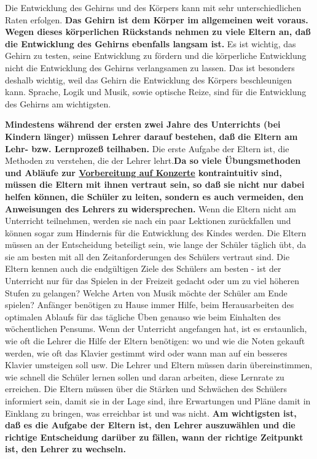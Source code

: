 Die Entwicklung des Gehirns und des Körpers kann mit sehr unterschiedlichen Raten erfolgen.
\textbf{Das Gehirn ist dem Körper im allgemeinen weit voraus.
Wegen dieses körperlichen Rückstands nehmen zu viele Eltern an, daß die Entwicklung des Gehirns ebenfalls langsam ist.}
Es ist wichtig, das Gehirn zu testen, seine Entwicklung zu fördern und die körperliche Entwicklung nicht die Entwicklung des Gehirns verlangsamen zu lassen.
Das ist besonders deshalb wichtig, weil das Gehirn die Entwicklung des Körpers beschleunigen kann.
Sprache, Logik und Musik, sowie optische Reize, sind für die Entwicklung des Gehirns am wichtigsten.

\textbf{Mindestens während der ersten zwei Jahre des Unterrichts (bei Kindern länger) müssen Lehrer darauf bestehen, daß die Eltern am Lehr- bzw. Lernprozeß teilhaben.}
Die erste Aufgabe der Eltern ist, die Methoden zu verstehen, die der Lehrer lehrt.\textbf{Da so viele Übungsmethoden und Abläufe zur \hyperlink{c1iii14}{Vorbereitung auf Konzerte} kontraintuitiv sind, müssen die Eltern mit ihnen vertraut sein, so daß sie nicht nur dabei helfen können, die Schüler zu leiten, sondern es auch vermeiden, den Anweisungen des Lehrers zu widersprechen.}
Wenn die Eltern nicht am Unterricht teilnehmen, werden sie nach ein paar Lektionen zurückfallen und können sogar zum Hindernis für die Entwicklung des Kindes werden.
Die Eltern müssen an der Entscheidung beteiligt sein, wie lange der Schüler täglich übt, da sie am besten mit all den Zeitanforderungen des Schülers vertraut sind.
Die Eltern kennen auch die endgültigen Ziele des Schülers am besten - ist der Unterricht nur für das Spielen in der Freizeit gedacht oder um zu viel höheren Stufen zu gelangen?
Welche Arten von Musik möchte der Schüler am Ende spielen?
Anfänger benötigen zu Hause immer Hilfe, beim Herausarbeiten des optimalen Ablaufs für das tägliche Üben genauso wie beim Einhalten des wöchentlichen Pensums.
Wenn der Unterricht angefangen hat, ist es erstaunlich, wie oft die Lehrer die Hilfe der Eltern benötigen: wo und wie die Noten gekauft werden, wie oft das Klavier gestimmt wird oder wann man auf ein besseres Klavier umsteigen soll usw.
Die Lehrer und Eltern müssen darin übereinstimmen, wie schnell die Schüler lernen sollen und daran arbeiten, diese Lernrate zu erreichen.
Die Eltern müssen über die Stärken und Schwächen des Schülers informiert sein, damit sie in der Lage sind, ihre Erwartungen und Pläne damit in Einklang zu bringen, was erreichbar ist und was nicht.
\textbf{Am wichtigsten ist, daß es die Aufgabe der Eltern ist, den Lehrer auszuwählen und die richtige Entscheidung darüber zu fällen, wann der richtige Zeitpunkt ist, den Lehrer zu wechseln.}

